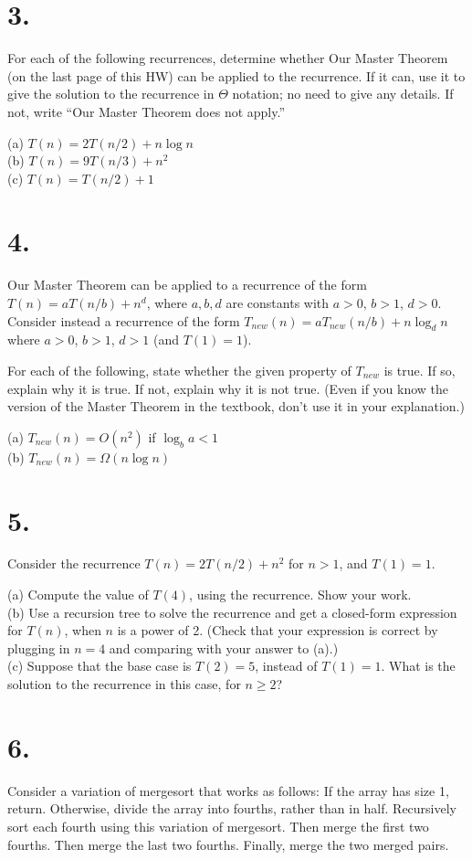 \documentclass{article}
\begin{document}
\section*{3.}
For each of the following recurrences, determine whether Our Master Theorem (on the last page of this HW) can be applied to the recurrence. If it can, use it to give the solution to the recurrence in $\Theta$ notation; no need to give any details. If not, write “Our Master Theorem does not apply.”

(a) $T(n) = 2T(n/2) + n \log n$ \\
(b) $T(n) = 9T(n/3) + n^2$ \\
(c) $T(n) = T(n/2) + 1$

\section*{4.}
Our Master Theorem can be applied to a recurrence of the form $T(n) = aT(n/b) + n^d$, where $a, b, d$ are constants with $a > 0$, $b > 1$, $d > 0$. Consider instead a recurrence of the form $T_{new}(n) = aT_{new}(n/b) + n \log_d n$ where $a > 0$, $b > 1$, $d > 1$ (and $T(1) = 1$).

For each of the following, state whether the given property of $T_{new}$ is true. If so, explain why it is true. If not, explain why it is not true. (Even if you know the version of the Master Theorem in the textbook, don’t use it in your explanation.)

(a) $T_{new}(n) = O(n^2)$ if $\log_b a < 1$ \\
(b) $T_{new}(n) = \Omega(n \log n)$


\section*{5.}
Consider the recurrence $T(n) = 2T(n/2) + n^2$ for $n > 1$, and $T(1) = 1$.

(a) Compute the value of $T(4)$, using the recurrence. Show your work. \\
(b) Use a recursion tree to solve the recurrence and get a closed-form expression for $T(n)$, when $n$ is a power of 2. (Check that your expression is correct by plugging in $n = 4$ and comparing with your answer to (a).) \\
(c) Suppose that the base case is $T(2) = 5$, instead of $T(1) = 1$. What is the solution to the recurrence in this case, for $n \geq 2$?

\section*{6.}
Consider a variation of mergesort that works as follows: If the array has size 1, return. Otherwise, divide the array into fourths, rather than in half. Recursively sort each fourth using this variation of mergesort. Then merge the first two fourths. Then merge the last two fourths. Finally, merge the two merged pairs.
\end{document}
